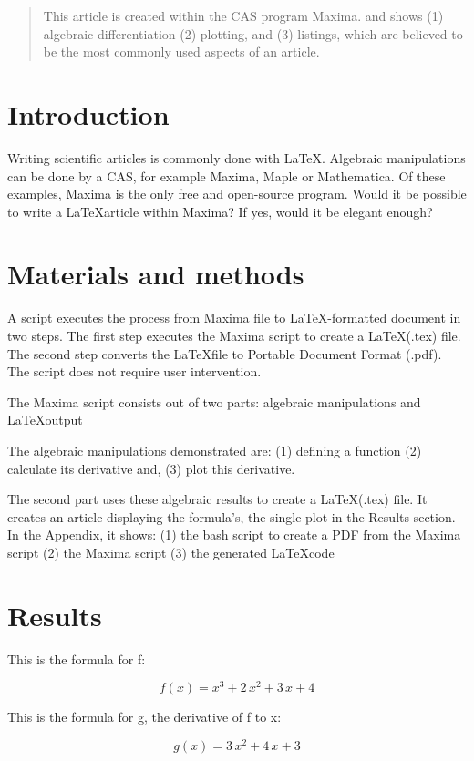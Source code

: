 \documentclass{article}
\begin{document}
\begin{abstract}
This article is created within the CAS program Maxima.
and shows (1) algebraic differentiation (2) plotting, and (3) listings,
which are believed to be the most commonly used aspects of an article.
\end{abstract}

\section{Introduction}

Writing scientific articles is commonly done with \LaTeX.
Algebraic manipulations can be done by a CAS, for example Maxima, Maple or Mathematica.
Of these examples, Maxima is the only free and open-source program.
Would it be possible to write a \LaTeX article within Maxima?
If yes, would it be elegant enough?

\section{Materials and methods}

A script executes the process from Maxima file to \LaTeX-formatted document in two steps.
The first step executes the Maxima script to create a \LaTeX (.tex) file.
The second step converts the \LaTeX file to Portable Document Format (.pdf).
The script does not require user intervention.

The Maxima script consists out of two parts:
algebraic manipulations and \LaTeX output

The algebraic manipulations demonstrated are: 
(1) defining a function
(2) calculate its derivative and,
(3) plot this derivative.

The second part uses these algebraic results to create a \LaTeX (.tex) file.
It creates an article displaying the formula's, the single plot in
the Results section.
In the Appendix, it shows: 
(1) the bash script to create a PDF from the Maxima script
(2) the Maxima script
(3) the generated \LaTeX code

\section{Results}

This is the formula for f:

$$f\left(x\right)=x^3+2\,x^2+3\,x+4$$

This is the formula for g, the derivative of f to x:

$$g\left(x\right)=3\,x^2+4\,x+3$$
\end{document}
